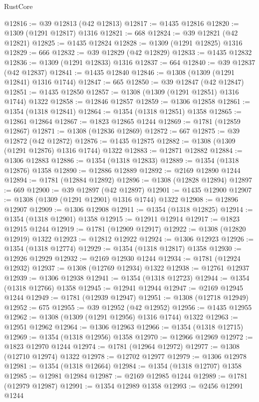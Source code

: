 \begin{lexlean}{RustCore}
\begin{coremodule}
@12816 := @39 @12813 (@42 @12813)
@12817 := @1435 @12816
@12820 := @1309 (@1291 @12817) @1316
@12821 := 668
@12824 := @39 @12821 (@42 @12821)
@12825 := @1435 @12824
@12828 := @1309 (@1291 @12825) @1316
@12829 := 666
@12832 := @39 @12829 (@42 @12829)
@12833 := @1435 @12832
@12836 := @1309 (@1291 @12833) @1316
@12837 := 664
@12840 := @39 @12837 (@42 @12837)
@12841 := @1435 @12840
@12846 := @1308 (@1309 (@1291 @12841) @1316 @1744)
@12847 := 665
@12850 := @39 @12847 (@42 @12847)
@12851 := @1435 @12850
@12857 := @1308 (@1309 (@1291 @12851) @1316 @1744) @1322
@12858 := @12846 @12857
@12859 := @1306 @12858
@12861 := @1354 (@1318 @12841)
@12864 := @1354 (@1318 @12851) @1358
@12865 := @12861 @12864
@12867 := @1823 @12865 @1244
@12869 := @1781 (@12859 @12867)
@12871 := @1308 (@12836 @12869)
@12872 := 667
@12875 := @39 @12872 (@42 @12872)
@12876 := @1435 @12875
@12882 := @1308 (@1309 (@1291 @12876) @1316 @1744) @1322
@12883 := @12871 @12882
@12884 := @1306 @12883
@12886 := @1354 (@1318 @12833)
@12889 := @1354 (@1318 @12876) @1358
@12890 := @12886 @12889
@12892 := @2169 @12890 @1244
@12894 := @1781 (@12884 @12892)
@12896 := @1308 (@12828 @12894)
@12897 := 669
@12900 := @39 @12897 (@42 @12897)
@12901 := @1435 @12900
@12907 := @1308 (@1309 (@1291 @12901) @1316 @1744) @1322
@12908 := @12896 @12907
@12909 := @1306 @12908
@12911 := @1354 (@1318 @12825)
@12914 := @1354 (@1318 @12901) @1358
@12915 := @12911 @12914
@12917 := @1823 @12915 @1244
@12919 := @1781 (@12909 @12917)
@12922 := @1308 (@12820 @12919) @1322
@12923 := @12812 @12922
@12924 := @1306 @12923
@12926 := @1354 (@1318 @12774)
@12929 := @1354 (@1318 @12817) @1358
@12930 := @12926 @12929
@12932 := @2169 @12930 @1244
@12934 := @1781 (@12924 @12932)
@12937 := @1308 (@12769 @12934) @1322
@12938 := @12761 @12937
@12939 := @1306 @12938
@12941 := @1354 (@1318 @12723)
@12944 := @1354 (@1318 @12766) @1358
@12945 := @12941 @12944
@12947 := @2169 @12945 @1244
@12949 := @1781 (@12939 @12947)
@12951 := @1308 (@12718 @12949)
@12952 := 675
@12955 := @39 @12952 (@42 @12952)
@12956 := @1435 @12955
@12962 := @1308 (@1309 (@1291 @12956) @1316 @1744) @1322
@12963 := @12951 @12962
@12964 := @1306 @12963
@12966 := @1354 (@1318 @12715)
@12969 := @1354 (@1318 @12956) @1358
@12970 := @12966 @12969
@12972 := @1823 @12970 @1244
@12974 := @1781 (@12964 @12972)
@12977 := @1308 (@12710 @12974) @1322
@12978 := @12702 @12977
@12979 := @1306 @12978
@12981 := @1354 (@1318 @12664)
@12984 := @1354 (@1318 @12707) @1358
@12985 := @12981 @12984
@12987 := @2169 @12985 @1244
@12989 := @1781 (@12979 @12987)
@12991 := @1354 @12989 @1358
@12993 := @2456 @12991 @1244

\end{coremodule}
\end{lexlean}
